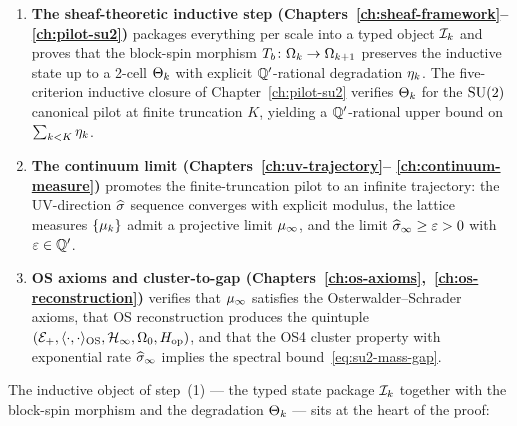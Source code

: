 \begin{enumerate}
  \item \textbf{The sheaf-theoretic inductive step
    (Chapters~\ref{ch:sheaf-framework}--\ref{ch:pilot-su2})}
    packages everything per scale into a typed object $\mathcal{I}_k$ and
    proves that the block-spin morphism $T_b \colon \Omega_k \to
    \Omega_{k+1}$ preserves the inductive state up to a 2-cell
    $\Theta_k$ with explicit $\mathbb{Q}'$-rational degradation
    $\eta_k$.  The five-criterion inductive closure of
    Chapter~\ref{ch:pilot-su2} verifies $\Theta_k$ for the
    $\mathrm{SU}(2)$ canonical pilot at finite truncation $K$, yielding
    a $\mathbb{Q}'$-rational upper bound on $\sum_{k < K} \eta_k$.
  \item \textbf{The continuum limit (Chapters~\ref{ch:uv-trajectory}--%
    \ref{ch:continuum-measure})} promotes the finite-truncation
    pilot to an infinite trajectory: the UV-direction $\widehat{\sigma}$
    sequence converges with explicit modulus, the lattice measures
    $\{\mu_k\}$ admit a projective limit $\mu_\infty$, and the limit
    $\widehat{\sigma}_\infty \ge \varepsilon > 0$ with $\varepsilon \in \mathbb{Q}'$.
  \item \textbf{OS axioms and cluster-to-gap
    (Chapters~\ref{ch:os-axioms},~\ref{ch:os-reconstruction})}
    verifies that $\mu_\infty$ satisfies the Osterwalder--Schrader
    axioms, that OS reconstruction produces the quintuple
    $(\mathcal{E}_+, \langle\cdot,\cdot\rangle_{\mathrm{OS}}, \mathcal{H}_\infty, \Omega_0, H_{\mathrm{op}})$, and that the OS4
    cluster property with exponential rate
    $\widehat{\sigma}_\infty$ implies the spectral
    bound~\eqref{eq:su2-mass-gap}.
\end{enumerate}

The inductive object of step~(1) — the typed state package $\mathcal{I}_k$
together with the block-spin morphism and the degradation $\Theta_k$ —
sits at the heart of the proof:

